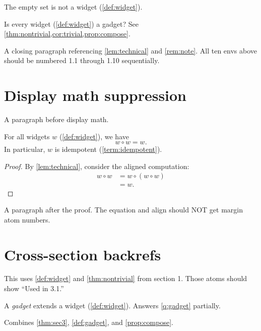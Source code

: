 \documentclass{article}
\begin{document}
\begin{example}\label{ex:empty}
The empty set is not a widget (\cref{def:widget}).
\end{example}

\begin{question}\label{q:gadget}
Is every widget (\cref{def:widget}) a gadget?
See \cref{thm:nontrivial,cor:trivial,prop:compose}.
\end{question}

A closing paragraph referencing \cref{lem:technical} and \cref{rem:note}.
All ten envs above should be numbered 1.1 through 1.10 sequentially.

\section{Display math suppression}

A paragraph before display math.

\begin{theorem}\label{thm:idempotent}
For all widgets $w$ (\cref{def:widget}), we have
\begin{equation}\label{eq:widget}
  w \circ w = w.
\end{equation}
In particular, $w$ is idempotent (\cref{term:idempotent}).
\end{theorem}

\begin{proof}
By \cref{lem:technical}, consider the aligned computation:
\begin{align}
  w \circ w &= w \circ (w \circ w) \\
            &= w.
\end{align}
\end{proof}

A paragraph after the proof. The equation and align should NOT get
margin atom numbers.

\section{Cross-section backrefs}

\begin{theorem}\label{thm:sec3}
This uses \cref{def:widget} and \cref{thm:nontrivial} from section 1.
Those atoms should show ``Used in 3.1.''
\end{theorem}

\begin{definition}\label{def:gadget}
A \emph{gadget} extends a widget (\cref{def:widget}).
Answers \cref{q:gadget} partially.
\end{definition}

\begin{corollary}\label{cor:sec3}
Combines \cref{thm:sec3}, \cref{def:gadget}, and \cref{prop:compose}.
\end{corollary}

\END
\end{document}
